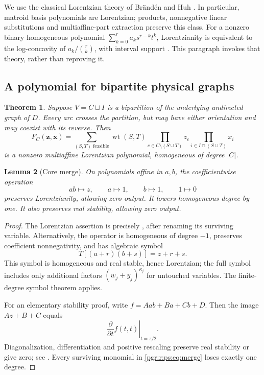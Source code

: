 \documentclass[11pt]{article}
\numberwithin{equation}{section}
\newtheorem{theorem}{Theorem}[section]\newtheorem{lemma}[theorem]{Lemma}\newtheorem{proposition}[theorem]{Proposition}\newtheorem{corollary}[theorem]{Corollary}
\theoremstyle{definition}\newtheorem{definition}[theorem]{Definition}\newtheorem{remark}[theorem]{Remark}
\newcommand{\wt}{\operatorname{wt}}        %
\begin{document}
We use the classical Lorentzian theory of Br\"and\'en and Huh \cite{BH}. In particular, matroid basis polynomials are Lorentzian; products, nonnegative linear substitutions and multiaffine-part extraction preserve this class. For a nonzero binary homogeneous polynomial $\sum_{k=0}^r a_k s^{r-k}t^k$, Lorentzianity is equivalent to the log-concavity of $a_k/\binom rk$, with interval support \cite[Example 2.26]{BH}. This paragraph invokes that theory, rather than reproving it.

\subsection{A polynomial for bipartite physical graphs}
\begin{theorem}\label{pgr:r:ps:thm:bipartite}
Suppose $V=C\sqcup I$ is a bipartition of the underlying undirected graph of $D$. Every arc crosses the partition, but may have either orientation and may coexist with its reverse. Then
\begin{equation}\label{pgr:r:ps:eq:physicalF}
 F_C(\mathbf z,\mathbf x)=
 \sum_{(S,T)\text{ feasible}}\wt(S,T)
 \prod_{c\in C\setminus(S\cup T)}z_c
 \prod_{i\in I\cap(S\cup T)}x_i
\end{equation}
is a nonzero multiaffine Lorentzian polynomial, homogeneous of degree $|C|$.
\end{theorem}

\begin{lemma}[Core merge]\label{pgr:r:ps:lem:merge}
On polynomials affine in $a,b$, the coefficientwise operation
\begin{equation}\label{pgr:r:ps:eq:merge}
 ab\longmapsto z,\qquad a\longmapsto1,\qquad b\longmapsto1,
 \qquad1\longmapsto0
\end{equation}
preserves Lorentzianity, allowing zero output. It lowers homogeneous degree by one. It also preserves real stability, allowing zero output.
\end{lemma}
\begin{proof}
The Lorentzian assertion is precisely \cite[Lemma 3.3]{BH}, after renaming its surviving variable. Alternatively, the operator is homogeneous of degree $-1$, preserves coefficient nonnegativity, and has algebraic symbol
\[
 T[(a+r)(b+s)]=z+r+s.
\]
This symbol is homogeneous and real stable, hence Lorentzian; the full symbol includes only additional factors $(w_j+y_j)^{\kappa_j}$ for untouched variables. The finite-degree symbol theorem \cite[Theorem 3.2]{BH} applies.

For an elementary stability proof, write $f=Aab+Ba+Cb+D$. Then the image $Az+B+C$ equals
\[
 \left.\frac{\partial}{\partial t}f(t,t)\right|_{t=z/2}.
\]
Diagonalization, differentiation and positive rescaling preserve real stability or give zero; see \cite{BB,WagnerSurvey}. Every surviving monomial in \eqref{pgr:r:ps:eq:merge} loses exactly one degree.
\end{proof}
\end{document}
